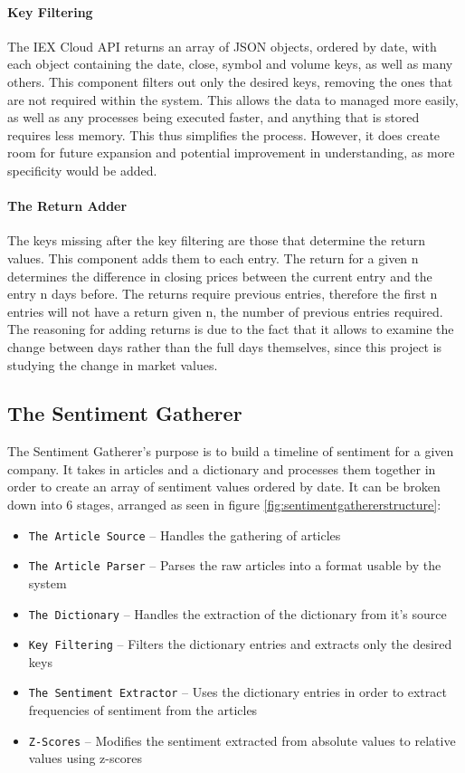 \paragraph{Key Filtering}

The IEX Cloud API returns an array of JSON objects, ordered by date, with each object containing the date, close, symbol and volume keys, as well as many others. This component filters out only the desired keys, removing the ones that are not required within the system. This allows the data to managed more easily, as well as any processes being executed faster, and anything that is stored requires less memory. This thus simplifies the process. However, it does create room for future expansion and potential improvement in understanding, as more specificity would be added.

\paragraph{The Return Adder}

The keys missing after the key filtering are those that determine the return values. This component adds them to each entry. The return for a given n determines the difference in closing prices between the current entry and the entry n days before. The returns require previous entries, therefore the first n entries will not have a return given n, the number of previous entries required. The reasoning for adding returns is due to the fact that it allows to examine the change between days rather than the full days themselves, since this project is studying the change in market values.

\subsection{The Sentiment Gatherer}

The Sentiment Gatherer's purpose is to build a timeline of sentiment for a given company. It takes in articles and a dictionary and processes them together in order to create an array of sentiment values ordered by date. It can be broken down into 6 stages, arranged as seen in figure \ref{fig:sentimentgathererstructure}:
\begin{itemize}
    \item \texttt{The Article Source} -- Handles the gathering of articles
    \item \texttt{The Article Parser} -- Parses the raw articles into a format usable by the system
    \item \texttt{The Dictionary} -- Handles the extraction of the dictionary from it's source
    \item \texttt{Key Filtering} -- Filters the dictionary entries and extracts only the desired keys
    \item \texttt{The Sentiment Extractor} -- Uses the dictionary entries in order to extract frequencies of sentiment from the articles
    \item \texttt{Z-Scores} -- Modifies the sentiment extracted from absolute values to relative values using z-scores
\end{itemize}

